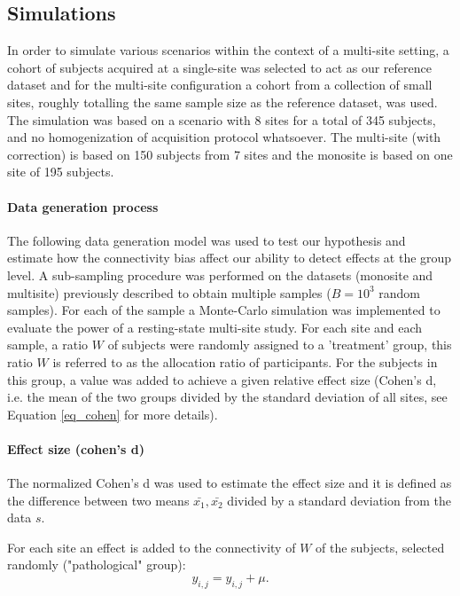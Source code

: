 \documentclass[authoryear]{elsarticle}
\begin{document}
\subsection{Simulations}

In order to simulate various scenarios within the context of a multi-site setting, a cohort of subjects acquired at a single-site was selected to act as our reference dataset and for the multi-site configuration a cohort from a collection of small sites, roughly totalling the same sample size as the reference dataset, was used. The simulation was based on a scenario with 8 sites for a total of 345 subjects, and no homogenization of acquisition protocol whatsoever. The multi-site (with correction) is based on 150 subjects from 7 sites and the monosite is based on one site of 195 subjects.  

\paragraph{Data generation process}
The following data generation model was used to test our hypothesis and estimate how the connectivity bias affect our ability to detect effects at the group level.
A sub-sampling procedure was performed on the datasets (monosite and multisite) previously described to obtain multiple samples ($B=10^3$ random samples). For each of the sample a Monte-Carlo simulation was implemented to evaluate the power of a resting-state multi-site study. For each site and each sample, a ratio $W$ of subjects were randomly assigned to a 'treatment' group, this ratio $W$ is referred to as the allocation ratio of participants. For the subjects in this group, a value was added to achieve a given relative effect size (Cohen's d, i.e. the mean of the two groups divided by the standard deviation of all sites, see Equation \ref{eq_cohen} for more details).

\paragraph{Effect size (cohen's d)}
The normalized Cohen's d was used to estimate the effect size and it is defined as the difference between two means $\bar{x_{1}},\bar{x_{2}}$ divided by a standard deviation from the data $s$.

For each site an effect is added to the connectivity of $W$ of the subjects, selected randomly ("pathological" group):
\begin{equation}
	y_{i,j} = y_{i,j} + \mu.
\end{equation}
\end{document}
